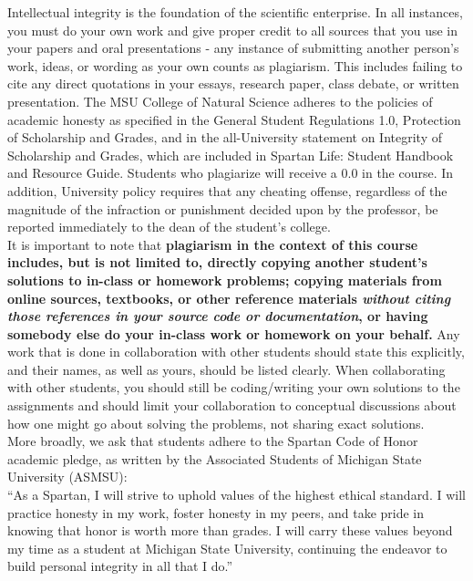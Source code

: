 \documentclass[oneside,letterpaper,11pt]{exam}
\begin{document}
{\noindent Intellectual integrity is the foundation of the scientific enterprise. In all instances, you must do your own work and give proper credit to all sources that you use in your papers and oral presentations - any instance of submitting another person's work, ideas, or wording as your own counts as plagiarism. This includes failing to cite any direct quotations in your essays, research paper, class debate, or written presentation. The MSU College of Natural Science adheres to the policies of academic honesty as specified in the General Student Regulations 1.0, Protection of Scholarship and Grades, and in the all-University statement on Integrity of Scholarship and Grades, which are included in Spartan Life: Student Handbook and Resource Guide. Students who plagiarize will receive a 0.0 in the course. In addition, University policy requires that any cheating offense, regardless of the magnitude of the infraction or punishment decided upon by the professor, be reported immediately to the dean of the student's college.}\\[-5pt]

{\noindent It is important to note that \textbf{plagiarism in the context of this course includes, but is not limited to, directly copying another student's solutions to in-class or homework problems; copying materials from online sources, textbooks, or other reference materials \emph{without citing those references in your source code or documentation}, or having somebody else do your in-class work or homework on your behalf.} Any work that is done in collaboration with other students should state this explicitly, and their names, as well as yours, should be listed clearly. When collaborating with other students, you should still be coding/writing your own solutions to the assignments and should limit your collaboration to conceptual discussions about how one might go about solving the problems, not sharing exact solutions.}\\[-5pt]

{\noindent More broadly, we ask that students adhere to the Spartan Code of Honor academic pledge, as written by the Associated Students of Michigan State University (ASMSU):}\\[-5pt]

{\noindent ``As a Spartan, I will strive to uphold values of the highest ethical standard. I will practice honesty in my work, foster honesty in my peers, and take pride in knowing that honor is worth more than grades. I will carry these values beyond my time as a student at Michigan State University, continuing the endeavor to build personal integrity in all that I do.''}\\
\end{document}
